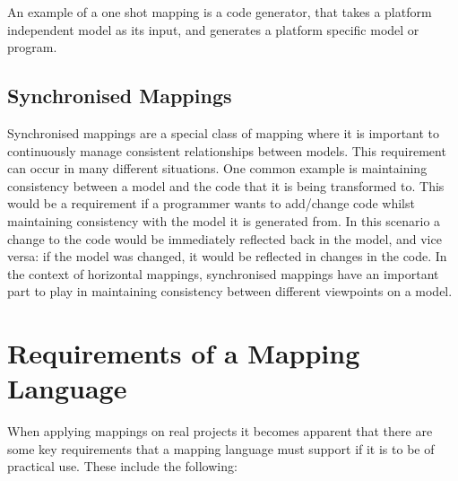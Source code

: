 An example of a one shot mapping is a code generator, that takes a
platform independent model as its input, and generates a platform
specific model or program.

\subsection{Synchronised Mappings}

Synchronised mappings are a special class of mapping where it is
important to continuously manage consistent relationships between
models. This requirement can occur in many different situations.
One common example is maintaining consistency between a model and
the code that it is being transformed to. This would be a
requirement if a programmer wants to add/change code whilst
maintaining consistency with the model it is generated from. In
this scenario a change to the code would be immediately reflected
back in the model, and vice versa: if the model was changed, it
would be reflected in changes in the code. In the context of
horizontal mappings, synchronised mappings have an important part
to play in maintaining consistency between different viewpoints on
a model.

\section{Requirements of a Mapping Language}

When applying mappings on real projects it becomes apparent that
there are some key requirements that a mapping language must
support if it is to be of practical use. These include the
following:

